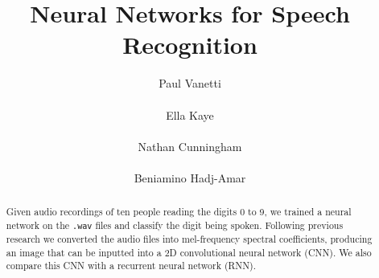 \documentclass{article} %
\title{Neural Networks for Speech Recognition}
\author{
Paul Vanetti \\
\texttt{} \\
\And
Ella Kaye \\
\texttt{} \\
\And
Nathan Cunningham \\
\texttt{} \\
\And
Beniamino Hadj-Amar \\
\texttt{}
}
\begin{document}
\maketitle


\begin{abstract}
Given audio recordings of ten people reading the digits 0 to 9, we trained a neural network on the \texttt{.wav} files and classify the digit being spoken. Following previous research we  converted the audio files into mel-frequency spectral coefficients, producing an image that can be inputted into a 2D convolutional neural network (CNN). We also compare this CNN with a recurrent neural network (RNN).
\end{abstract}








% 




\end{document}
